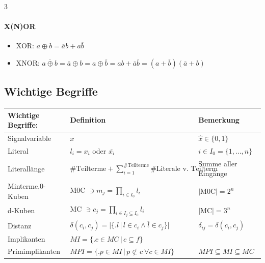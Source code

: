 \documentclass[6pt,a4paper]{scrartcl}
\newcommand{\iset}[2]{\ensuremath{\bigl\{ \bigl. #1 \, \bigr| \, #2 \bigr\}}}		%
\newcommand{\eset}[1]{\ensuremath{\bigl\{#1\bigr\}}}								%
\begin{document}
\begin{multicols*}{3}
	\paragraph{X(N)OR}
	\begin{itemize}
		\item XOR: $a\oplus b=\overline a b + a \overline b$
		\item XNOR: $\overline{a\oplus b} = \overline a \oplus b = a \oplus \overline b =ab + \overline a \overline b = (a+\overline b)(\overline a + b)$
	\end{itemize}

	\subsection{Wichtige Begriffe}
	\begin{tabular}{l|l|l}
		Wichtige Begriffe: & Definition                                                                        & Bemerkung                       \\ \hline
		Signalvariable     & $x$                                                                               & $\hat x \in \eset{0,1}$         \\
		Literal            & $l_i = x_i$ oder $\overline{x_i}$                                                 & $i \in I_0=\eset{1,...,n}$      \\
		Literallänge       & $\#\text{Teilterme}+\sum_{i=1}^{\#\text{Teilterme}}\#\text{Literale v. Teilterm}$ & Summe aller Eingänge            \\
		Minterme,0-Kuben   & M0C $\ni m_j = \prod\limits_{i\in I_0} l_i$                                       & $|$M0C$| = 2^n$                 \\
		d-Kuben            & MC $\ni c_j = \prod\limits_{i\in I_j \subseteq I_0} l_i$                          & $|$MC$|=3^n$                    \\
		Distanz            & $\delta(c_i,c_j) = \bigl| \iset{l}{l \in c_i \land \overline{l}\in c_j}  \bigr|$  & $\delta_{ij} = \delta(c_i,c_j)$ \\
		Implikanten        & $MI = \iset{c \in MC}{c \subseteq f}$                                             &                                 \\
		Primimplikanten    & $MPI = \iset{p \in MI}{p \not\subset c \ \forall c \in MI}$                       & $MPI \subseteq MI \subseteq MC$ \\
	\end{tabular}\\ \\

\end{multicols*}
\end{document}

